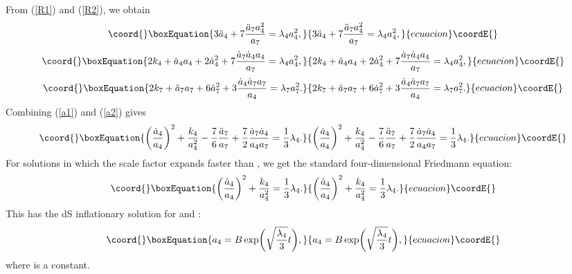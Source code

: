 \documentclass[a4paper,12pt]{article}
\begin{document}
From (\ref{R1}) and (\ref{R2}), we obtain
\begin{equation}\coord{}\boxEquation{
\label{a1}
3{\ddot a}_4+7\frac{{\ddot a}_7a^2_4}{a_7}=\lambda_4a^2_4,
}{
3{\ddot a}_4+7\frac{{\ddot a}_7a^2_4}{a_7}=\lambda_4a^2_4,
}{ecuacion}\coordE{}\end{equation}
\begin{equation}\coord{}\boxEquation{
\label{a2}
2k_4+{\ddot a}_4a_4+2{\dot a}^2_4+7\frac{{\dot a}_7{\dot
a}_4a_4}{a_7}=\lambda_4a^2_4,
}{
2k_4+{\ddot a}_4a_4+2{\dot a}^2_4+7\frac{{\dot a}_7{\dot
a}_4a_4}{a_7}=\lambda_4a^2_4,
}{ecuacion}\coordE{}\end{equation}
\begin{equation}\coord{}\boxEquation{
2k_7+{\ddot a}_7a_7+6{\dot a}^2_7
+3\frac{{\dot a}_4{\dot a}_7a_7}{a_4}=\lambda_7a^2_7.
}{
2k_7+{\ddot a}_7a_7+6{\dot a}^2_7
+3\frac{{\dot a}_4{\dot a}_7a_7}{a_4}=\lambda_7a^2_7.
}{ecuacion}\coordE{}\end{equation}
Combining (\ref{a1}) and (\ref{a2}) gives
\begin{equation}\coord{}\boxEquation{
\biggl(\frac{{\dot a}_4}{a_4}\biggr)^2+\frac{k_4}{a^2_4}
-\frac{7}{6}\frac{{\ddot a}_7}{a_7}
+\frac{7}{2}\frac{{\dot a}_7{\dot a}_4}{a_4a_7}=\frac{1}{3}\lambda_4.
}{
\biggl(\frac{{\dot a}_4}{a_4}\biggr)^2+\frac{k_4}{a^2_4}
-\frac{7}{6}\frac{{\ddot a}_7}{a_7}
+\frac{7}{2}\frac{{\dot a}_7{\dot a}_4}{a_4a_7}=\frac{1}{3}\lambda_4.
}{ecuacion}\coordE{}\end{equation}
For solutions in which the scale factor \coordHE{} expands
faster than \coordHE{}, we get the standard four-dimensional Friedmann equation:
\begin{equation}\coord{}\boxEquation{
\biggl(\frac{{\dot a}_4}{a_4}\biggr)^2
+\frac{k_4}{a^2_4}=\frac{1}{3}\lambda_4.
}{
\biggl(\frac{{\dot a}_4}{a_4}\biggr)^2
+\frac{k_4}{a^2_4}=\frac{1}{3}\lambda_4.
}{ecuacion}\coordE{}\end{equation}
This has the dS inflationary solution for \coordHE{} and \coordHE{}:
\begin{equation}\coord{}\boxEquation{
a_4=B\exp\biggl(\sqrt{\frac{\lambda_4}{3}}t\biggr),
}{
a_4=B\exp\biggl(\sqrt{\frac{\lambda_4}{3}}t\biggr),
}{ecuacion}\coordE{}\end{equation}
where \coordHE{} is a constant.
\end{document}
